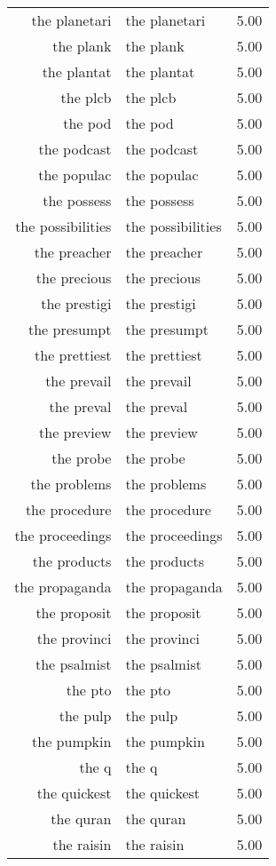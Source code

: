\begin{table}[ht]
\begin{tabular}{rlr}
  the planetari & the planetari & 5.00 \\ 
  the plank & the plank & 5.00 \\ 
  the plantat & the plantat & 5.00 \\ 
  the plcb & the plcb & 5.00 \\ 
  the pod & the pod & 5.00 \\ 
  the podcast & the podcast & 5.00 \\ 
  the populac & the populac & 5.00 \\ 
  the possess & the possess & 5.00 \\ 
  the possibilities & the possibilities & 5.00 \\ 
  the preacher & the preacher & 5.00 \\ 
  the precious & the precious & 5.00 \\ 
  the prestigi & the prestigi & 5.00 \\ 
  the presumpt & the presumpt & 5.00 \\ 
  the prettiest & the prettiest & 5.00 \\ 
  the prevail & the prevail & 5.00 \\ 
  the preval & the preval & 5.00 \\ 
  the preview & the preview & 5.00 \\ 
  the probe & the probe & 5.00 \\ 
  the problems & the problems & 5.00 \\ 
  the procedure & the procedure & 5.00 \\ 
  the proceedings & the proceedings & 5.00 \\ 
  the products & the products & 5.00 \\ 
  the propaganda & the propaganda & 5.00 \\ 
  the proposit & the proposit & 5.00 \\ 
  the provinci & the provinci & 5.00 \\ 
  the psalmist & the psalmist & 5.00 \\ 
  the pto & the pto & 5.00 \\ 
  the pulp & the pulp & 5.00 \\ 
  the pumpkin & the pumpkin & 5.00 \\ 
  the q & the q & 5.00 \\ 
  the quickest & the quickest & 5.00 \\ 
  the quran & the quran & 5.00 \\ 
  the raisin & the raisin & 5.00 \\ 

\end{tabular}
\end{table}
